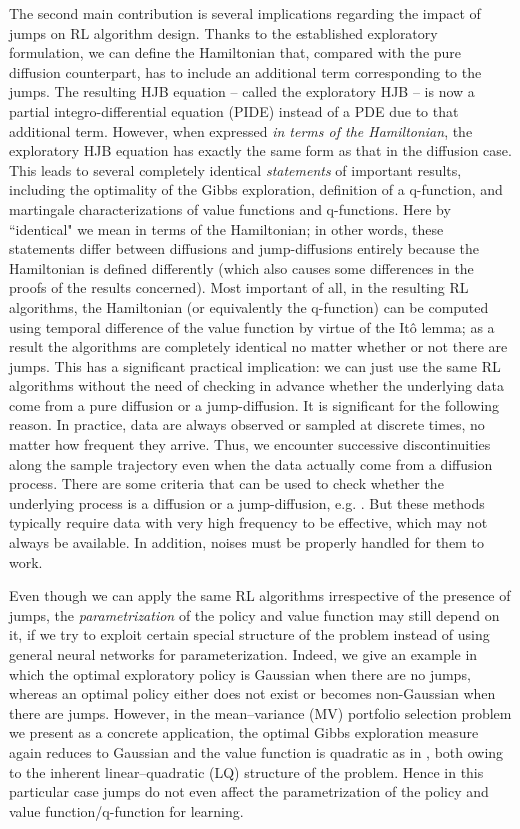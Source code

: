 \documentclass[11pt]{article}
\newcommand{\1}{\mathbbm{1}}
\begin{document}
The second main contribution is several implications regarding the impact of jumps on RL algorithm design.
Thanks to the established exploratory formulation, we can define the Hamiltonian that, compared with the pure diffusion counterpart,  has to include an additional term corresponding to the jumps. The resulting HJB equation -- called the exploratory HJB -- is now a partial integro-differential equation (PIDE) instead of a PDE due to that additional term. However, when expressed {\it in terms of the Hamiltonian}, the exploratory HJB equation has exactly the same form as that in the diffusion case. This leads to several completely identical {\it statements} of important results, including the optimality of the Gibbs exploration, definition of a q-function, and martingale characterizations of value functions and q-functions. Here by ``identical" we mean in terms of the Hamiltonian; in other words, these statements differ between diffusions and jump-diffusions entirely because the Hamiltonian is defined differently (which also causes some differences in the proofs of the results concerned). Most important of all, in the resulting RL algorithms, the Hamiltonian (or equivalently the q-function) can be computed using temporal difference of the value function by virtue of the It\^o lemma; as a result the algorithms are completely identical no matter whether or not there are jumps. This has a significant practical implication: we can just use the same RL algorithms  without the need of checking in advance whether the underlying data come from a pure diffusion or a jump-diffusion. It is significant for the following reason. In practice, data are always observed or sampled at discrete times, no matter how frequent they arrive. Thus, we encounter successive discontinuities along the sample trajectory even when the data actually come from a diffusion process. There are some criteria that can be used to check whether the underlying process is a diffusion or a jump-diffusion, e.g. \cite{ait2012testing, wang2022testing}. But these methods typically require data with very high frequency to be effective, which may not always be available. In addition, noises must be properly handled for them to work.

Even though we can apply the same RL algorithms irrespective of the presence of jumps, the {\it parametrization} of the policy and value function may still depend on it, if we try to exploit certain special structure of the problem instead of using general neural networks for parameterization. Indeed, we give an example in which the optimal exploratory policy is Gaussian when there are no jumps, whereas an optimal policy either does not exist or becomes non-Gaussian when there are jumps. However, in the mean--variance (MV) portfolio selection problem we present as a concrete application, the optimal Gibbs exploration measure again reduces to Gaussian and the value function is quadratic as in \cite{wang2020continuous}, both owing to the inherent linear--quadratic (LQ) structure of the problem. Hence in this particular case jumps do not even affect the parametrization of the policy and value function/q-function for learning.
\end{document}
